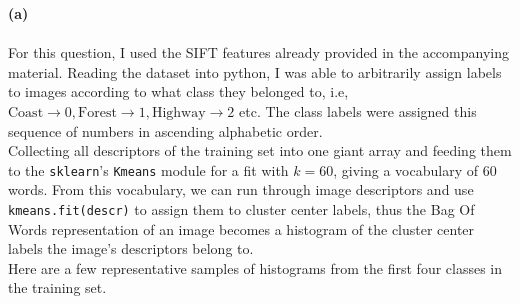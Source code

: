 \pagebreak

\begin{homeworkProblem}
  \textbf{(a)}
  \\
  \\

  For this question, I used the SIFT features already provided in the
  accompanying material. Reading the dataset into python, I was able to
  arbitrarily assign labels to images according to what class they belonged to,
  i.e, $\mathrm{Coast}\to0, \mathrm{Forest}\to1, \mathrm{Highway}\to2$ etc. The class
  labels were assigned this sequence of numbers in ascending alphabetic order.
  \\

  Collecting all descriptors of the training set into one giant array and
  feeding them to the \texttt{sklearn}'s \texttt{Kmeans} module for a fit 
  with $k = 60$, giving a vocabulary of $60$ words. From this vocabulary, we can run through
  image descriptors and use \texttt{kmeans.fit(descr)} to assign
  them to cluster center labels, thus the Bag Of Words representation of an
  image becomes a histogram of the cluster center labels the image's descriptors
  belong to.
  \\

  Here are a few representative samples of histograms from the first four
  classes in the training set.

\begin{figure}[H]
  \centering
  \begin{subfigure}{.4\textwidth}
  \end{subfigure}%
  \begin{subfigure}{.4\textwidth}
  \end{subfigure}


\end{figure}
\end{homeworkProblem}
